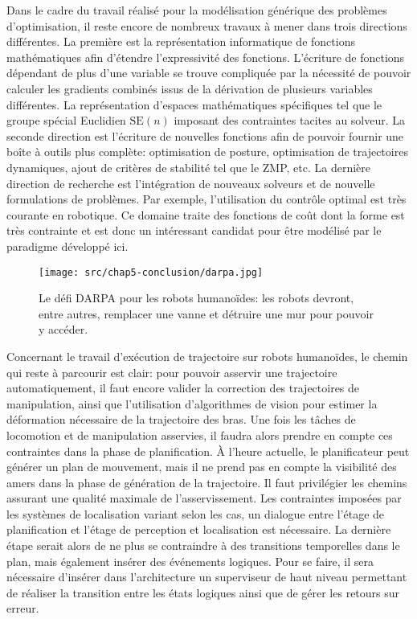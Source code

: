 Dans le cadre du travail réalisé pour la modélisation générique des
problèmes d'optimisation, il reste encore de nombreux travaux à mener
dans trois directions différentes. La première est la représentation
informatique de fonctions mathématiques afin d'étendre l'expressivité
des fonctions. L'écriture de fonctions dépendant de plus d'une
variable se trouve compliquée par la nécessité de pouvoir calculer les
gradients combinés issus de la dérivation de plusieurs variables
différentes. La représentation d'espaces mathématiques spécifiques tel
que le groupe spécial Euclidien $\text{SE}(n)$ imposant des
contraintes tacites au solveur. La seconde direction est l'écriture de
nouvelles fonctions afin de pouvoir fournir une boîte à outils plus
complète: optimisation de posture, optimisation de trajectoires
dynamiques, ajout de critères de stabilité tel que le ZMP, etc. La
dernière direction de recherche est l'intégration de nouveaux solveurs
et de nouvelle formulations de problèmes. Par exemple, l'utilisation
du contrôle optimal est très courante en robotique. Ce domaine traite
des fonctions de coût dont la forme est très contrainte et est donc un
intéressant candidat pour être modélisé par le paradigme développé
ici.


\begin{figure}[htbp]
  \begin{center}
    \texttt{[image: src/chap5-conclusion/darpa.jpg]}
  \end{center}
  \caption{Le défi DARPA pour les robots humanoïdes: les robots
    devront, entre autres, remplacer une vanne et détruire une mur pour
    pouvoir y accéder. \label{fig:darpachallenge}}
\end{figure}


Concernant le travail d'exécution de trajectoire sur robots humanoïdes,
le chemin qui reste à parcourir est clair: pour pouvoir asservir une
trajectoire automatiquement, il faut encore valider la correction des
trajectoires de manipulation, ainsi que l'utilisation d'algorithmes de
vision pour estimer la déformation nécessaire de la trajectoire des
bras. Une fois les tâches de locomotion et de manipulation asservies,
il faudra alors prendre en compte ces contraintes dans la phase de
planification. À l'heure actuelle, le planificateur peut générer un
plan de mouvement, mais il ne prend pas en compte la visibilité des
amers dans la phase de génération de la trajectoire. Il faut
privilégier les chemins assurant une qualité maximale de
l'asservissement. Les contraintes imposées par les systèmes de
localisation variant selon les cas, un dialogue entre l'étage de
planification et l'étage de perception et localisation est nécessaire.
La dernière étape serait alors de ne plus se contraindre à des
transitions temporelles dans le plan, mais également insérer des
événements logiques. Pour se faire, il sera nécessaire d'insérer dans
l'architecture un superviseur de haut niveau permettant de réaliser la
transition entre les états logiques ainsi que de gérer les retours sur
erreur.


